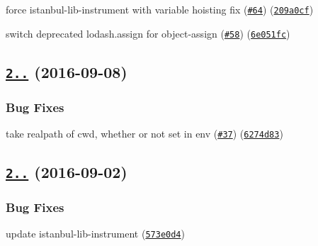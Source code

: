 \begin{DoxyItemize}
\item force istanbul-\/lib-\/instrument with variable hoisting fix (\href{https://github.com/istanbuljs/babel-plugin-istanbul/issues/64}{\tt \#64}) (\href{https://github.com/istanbuljs/babel-plugin-istanbul/commit/209a0cf}{\tt 209a0cf})
\item switch deprecated lodash.\+assign for object-\/assign (\href{https://github.com/istanbuljs/babel-plugin-istanbul/issues/58}{\tt \#58}) (\href{https://github.com/istanbuljs/babel-plugin-istanbul/commit/6e051fc}{\tt 6e051fc})
\end{DoxyItemize}

\label{_2.0.2}%
 \subsection*{\href{https://github.com/istanbuljs/babel-plugin-istanbul/compare/v2.0.1...v2.0.2}{\tt 2..} (2016-\/09-\/08)}

\subsubsection*{Bug Fixes}


\begin{DoxyItemize}
\item take realpath of cwd, whether or not set in env (\href{https://github.com/istanbuljs/babel-plugin-istanbul/issues/37}{\tt \#37}) (\href{https://github.com/istanbuljs/babel-plugin-istanbul/commit/6274d83}{\tt 6274d83})
\end{DoxyItemize}

\label{_2.0.1}%
 \subsection*{\href{https://github.com/istanbuljs/babel-plugin-istanbul/compare/v2.0.0...v2.0.1}{\tt 2..} (2016-\/09-\/02)}

\subsubsection*{Bug Fixes}


\begin{DoxyItemize}
\item update istanbul-\/lib-\/instrument (\href{https://github.com/istanbuljs/babel-plugin-istanbul/commit/573e0d4}{\tt 573e0d4})
\end{DoxyItemize}

